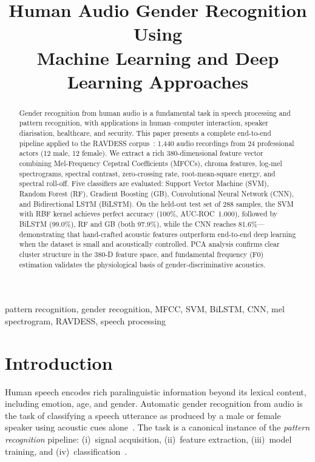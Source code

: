 \documentclass[conference]{IEEEtran}
\title{Human Audio Gender Recognition Using\\
       Machine Learning and Deep Learning Approaches}
\author{
  \IEEEauthorblockN{Mahardika Ramadhana}
  \IEEEauthorblockA{
    Computer Science\\
    \textit{Universitas Gadjah Mada}\\
    mahardika.ramadhana@mail.ugm.ac.id
  }
}
\begin{document}
\maketitle
\IEEEpeerreviewmaketitle

\begin{abstract}
Gender recognition from human audio is a fundamental task in speech
processing and pattern recognition, with applications in human--computer
interaction, speaker diarisation, healthcare, and security.
This paper presents a complete end-to-end pipeline applied to the RAVDESS
corpus~\cite{livingstone2018ravdess}: 1{,}440 audio recordings from 24
professional actors (12 male, 12 female).
We extract a rich 380-dimensional feature vector combining
Mel-Frequency Cepstral Coefficients (MFCCs), chroma features,
log-mel spectrograms, spectral contrast, zero-crossing rate,
root-mean-square energy, and spectral roll-off.
Five classifiers are evaluated: Support Vector Machine (SVM), Random Forest
(RF), Gradient Boosting (GB), Convolutional Neural Network (CNN), and
Bidirectional LSTM (BiLSTM).
On the held-out test set of 288 samples, the SVM with RBF kernel achieves
perfect accuracy (100\%, AUC-ROC~1.000), followed by BiLSTM (99.0\%),
RF and GB (both 97.9\%), while the CNN reaches 81.6\%---demonstrating
that hand-crafted acoustic features outperform end-to-end deep learning
when the dataset is small and acoustically controlled.
PCA analysis confirms clear cluster structure in the 380-D feature space,
and fundamental frequency (F0) estimation validates the physiological
basis of gender-discriminative acoustics.
\end{abstract}

\begin{IEEEkeywords}
pattern recognition, gender recognition, MFCC, SVM, BiLSTM, CNN,
mel spectrogram, RAVDESS, speech processing
\end{IEEEkeywords}

\section{Introduction}

Human speech encodes rich paralinguistic information beyond its lexical
content, including emotion, age, and gender. Automatic gender recognition
from audio is the task of classifying a speech utterance as produced by a
male or female speaker using acoustic cues alone~\cite{makhoul1975linear}.
The task is a canonical instance of the \emph{pattern recognition}
pipeline: (i)~signal acquisition, (ii)~feature extraction,
(iii)~model training, and (iv)~classification~\cite{bishop2006pattern}.
\end{document}
